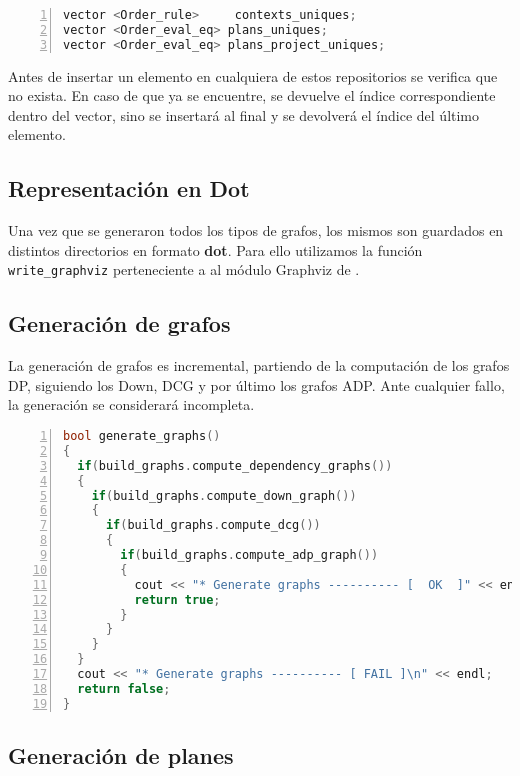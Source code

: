 \begin{lstlisting}[language=C++, basicstyle=\scriptsize, numbers=left, columns=fullflexible, linewidth=8cm]
vector <Order_rule>     contexts_uniques;
vector <Order_eval_eq> plans_uniques;
vector <Order_eval_eq> plans_project_uniques;
\end{lstlisting}

Antes de insertar un elemento en cualquiera de estos repositorios se verifica que no exista. En caso de que ya se encuentre, se devuelve el índice correspondiente dentro del vector, sino se insertará al final y se devolverá el índice del último elemento.

\subsection*{Representación en Dot}

Una vez que se generaron todos los tipos de grafos, los mismos son guardados en distintos directorios en formato \textbf{dot}\cite{dot}. Para ello utilizamos la función \texttt{write\_graphviz} perteneciente a al módulo Graphviz de \boost.

\subsection*{Generación de grafos}

La generación de grafos es incremental, partiendo de la computación de los grafos DP, siguiendo los Down, DCG y por último los grafos ADP. Ante cualquier fallo, la generación se considerará incompleta.

\begin{lstlisting}[language=C++, basicstyle=\scriptsize, numbers=left, columns=fullflexible, linewidth=10.5cm]
bool generate_graphs()
{
  if(build_graphs.compute_dependency_graphs())
  {
    if(build_graphs.compute_down_graph())
    {
      if(build_graphs.compute_dcg())
      {
        if(build_graphs.compute_adp_graph())
        {
          cout << "* Generate graphs ---------- [  OK  ]" << endl;
          return true;
        }
      }
    }
  }
  cout << "* Generate graphs ---------- [ FAIL ]\n" << endl;
  return false;
}
\end{lstlisting}
\vspace{0.3cm}

\subsection*{Generación de planes}
\label{sec:genplanes}

